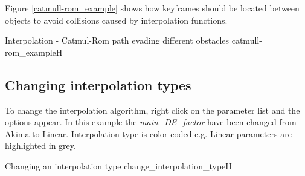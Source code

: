 Figure \ref{catmull-rom_example} shows how keyframes should be located between objects to avoid collisions caused by interpolation functions.

{Interpolation - Catmul-Rom path evading different obstacles}
{catmull-rom_example}{H}

\subsection{Changing interpolation types}\label{changing-interpolation-types}

To change the interpolation algorithm, right click on the parameter list and the
options appear. In this example the \emph{main\_DE\_factor} have been
changed from Akima to Linear. Interpolation type is color coded e.g. Linear
parameters are highlighted in grey.

{Changing an interpolation type}
{change_interpolation_type}{H}

